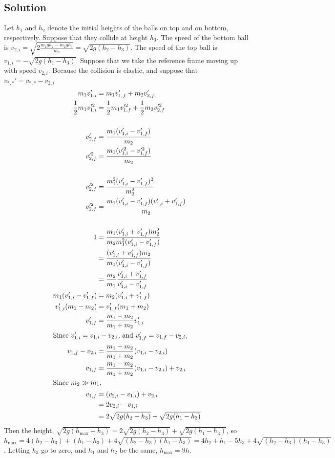 \documentclass[solutions]{esg8012pset}
\begin{document}
\subsection{Solution}
  Let $h_1$ and $h_2$ denote the initial heights of the balls on top and on bottom, respectively.  Suppose that they collide at height $h_3$.  The speed of the bottom ball is $v_{2, i} = \sqrt{2\frac{m_2gh_2 - m_2 g h_3}{m_2}} = \sqrt{2g(h_2 - h_3)}$.  The speed of the top ball is $v_{1, i} = -\sqrt{2g(h_1-h_3)}$.  Suppose that we take the reference frame moving up with speed $v_{2, i}$.  Because the collision is elastic, and suppose that $v_{*, *}' = v_{*, *} - v_{2, i}$ \begin{align*}
    m_1 v_{1,i}' & = m_1 v_{1,f}' + m_2 v_{2,f}' \\
    \frac{1}{2}m_1 v_{1,i}'^2 & = \frac{1}{2}m_1 v_{1,f}'^2 + \frac{1}{2}m_2 v_{2,f}'^2 \\
    \\
    v_{2,f}' & =  \frac{m_1(v_{1,i}' - v_{1,f}')}{m_2} \\
    v_{2,f}'^2 & = \frac{m_1(v_{1,i}'^2 - v_{1,f}'^2)}{m_2} \\
    \\
    v_{2,f}'^2 & = \frac{m_1^2(v_{1,i}' - v_{1,f}')^2}{m_2^2} \\
    v_{2,f}'^2 & = \frac{m_1(v_{1,i}' - v_{1,f}')(v_{1,i}' + v_{1,f}')}{m_2} \\
    \\
    1 & = \frac{m_1(v_{1,i}' + v_{1,f}') m_2^2}{m_2 m_1^2 (v_{1,i}' - v_{1,f}')} \\
      & = \frac{(v_{1,i}' + v_{1,f}') m_2}{m_1 (v_{1,i}' - v_{1,f}')} \\
      & = \frac{m_2}{m_1}\frac{v_{1,i}' + v_{1,f}'}{v_{1,i}' - v_{1,f}'} \\
    m_1(v_{1,i}' - v_{1,f}') & = m_2(v_{1,i}' + v_{1,f}') \\
    v_{1,i}'(m_1 - m_2) & =  v_{1,f}'(m_1 + m_2) \\
    v_{1, f}' & = \frac{m_1 - m_2}{m_1 + m_2}v_{1,i}' \\
    \intertext{Since $v_{1, i}' = v_{1, i} - v_{2, i}$, and $v_{1, f}' = v_{1, f} - v_{2, i}$,}
    v_{1, f} - v_{2, i} & = \frac{m_1 - m_2}{m_1 + m_2}(v_{1, i} - v_{2, i}) \\
    v_{1, f} & = \frac{m_1 - m_2}{m_1 + m_2}(v_{1, i} - v_{2, i}) + v_{2, i} \\
    \intertext{Since $m_2\gg m_1$,}
    v_{1, f} & = (v_{2, i} - v_{1, i}) + v_{2, i} \\
    & = 2v_{2, i} - v_{1, i} \\
    & = 2\sqrt{2g(h_2 - h_3)} + \sqrt{2g(h_1-h_3)}
    \end{align*}
    Then the height, $\sqrt{2g(h_{\text{max}} - h_3)} = 2\sqrt{2g(h_2 - h_3)} + \sqrt{2g(h_1-h_3)}$, so $h_{\text{max}} = 4(h_2 - h_3) + (h_1 - h_3) + 4\sqrt{(h_2 - h_3)(h_1 - h_3)} = 4h_2 + h_1 - 5h_3 + 4\sqrt{(h_2 - h_3)(h_1 - h_3)}$.  Letting $h_3$ go to zero, and $h_1$ and $h_2$ be the same, $h_{\text{max}} = 9h$.
\end{document}
